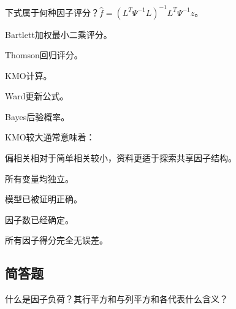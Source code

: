 \par\addvspace{6pt}\noindent\begin{minipage}{\linewidth}


下式属于何种因子评分？\(\widehat f=(L^T\Psi^{-1}L)^{-1}L^T\Psi^{-1}z\)。


\begin{choices}

\item Bartlett加权最小二乘评分。

\item Thomson回归评分。

\item KMO计算。

\item Ward更新公式。

\item Bayes后验概率。

\end{choices}

\end{minipage}\par\vspace{4pt}

\par\addvspace{6pt}\noindent\begin{minipage}{\linewidth}


KMO较大通常意味着：


\begin{choices}

\item 偏相关相对于简单相关较小，资料更适于探索共享因子结构。

\item 所有变量均独立。

\item 模型已被证明正确。

\item 因子数已经确定。

\item 所有因子得分完全无误差。

\end{choices}

\end{minipage}\par\vspace{4pt}

\par\addvspace{6pt}\noindent\begin{minipage}{\linewidth}

\subsection{简答题}


什么是因子负荷？其行平方和与列平方和各代表什么含义？



\end{minipage}\par\vspace{4pt}

